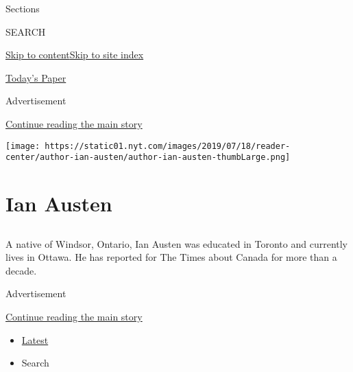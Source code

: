 Sections

SEARCH

\protect\hyperlink{site-content}{Skip to
content}\protect\hyperlink{site-index}{Skip to site index}

\href{https://myaccount.nytimes.com/auth/login?response_type=cookie\&client_id=vi}{}

\href{https://www.nytimes.com/section/todayspaper}{Today's Paper}

Advertisement

\protect\hyperlink{after-top}{Continue reading the main story}

\texttt{[image: https://static01.nyt.com/images/2019/07/18/reader-center/author-ian-austen/author-ian-austen-thumbLarge.png]}

\hypertarget{ian-austen}{%
\section{Ian Austen}\label{ian-austen}}

\subsection{}

A native of Windsor, Ontario, Ian Austen was educated in Toronto and
currently lives in Ottawa. He has reported for The Times about Canada
for more than a decade.

Advertisement

\protect\hyperlink{after-mid1}{Continue reading the main story}

\begin{itemize}
\tightlist
\item
  \protect\hyperlink{stream-panel}{Latest}
\item
  Search
\end{itemize}

